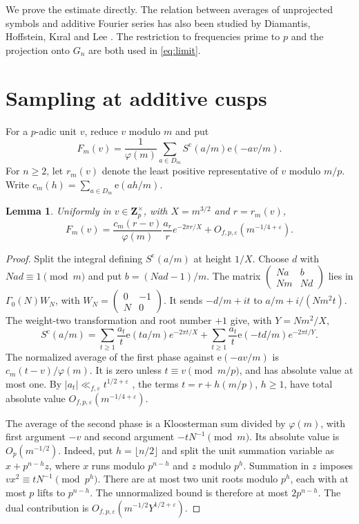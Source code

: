 \documentclass[11pt]{article}
\newtheorem{lemma}[theorem]{Lemma}
\newcommand{\Z}{\mathbf Z}
\newcommand{\ee}{\mathrm e}
\begin{document}
We prove the estimate directly. The relation between averages of
unprojected symbols and additive Fourier series has also been studied
by Diamantis, Hoffstein, K{\i}ral and Lee \cite{dhkl}.
The restriction to frequencies prime to \(p\) and the projection onto
\(G_n\) are both used in \eqref{eq:limit}.

\section{Sampling at additive cusps}

For a \(p\)-adic unit \(v\), reduce \(v\) modulo \(m\) and put
\[
 F_m(v)=\frac{1}{\varphi(m)}\sum_{a\in D_m}
                     S^{\mathrm c}(a/m)\ee(-av/m).
\]
For \(n\ge2\), let \(r_m(v)\) denote the least positive representative
of \(v\) modulo \(m/p\). Write \(c_m(h)=\sum_{a\in D_m}\ee(ah/m)\).

\begin{lemma}\label{lem:sampling}
Uniformly in \(v\in\Z_p^\times\), with \(X=m^{3/2}\) and \(r=r_m(v)\),
\[
 F_m(v)=\frac{c_m(r-v)}{\varphi(m)}\frac{a_r}{r}e^{-2\pi r/X}
           +O_{f,p,\varepsilon}(m^{-1/4+\varepsilon}).
\]
\end{lemma}

\begin{proof}
Split the integral defining \(S^{\mathrm c}(a/m)\) at height \(1/X\).
Choose \(d\) with \(Nad\equiv1\pmod m\) and put \(b=(Nad-1)/m\).
The matrix
\(\left(\begin{smallmatrix}Na&b\\ Nm&Nd\end{smallmatrix}\right)\)
lies in \(\Gamma_0(N)W_N\), with
\(W_N=\left(\begin{smallmatrix}0&-1\\N&0\end{smallmatrix}\right)\).
It sends \(-d/m+i t\) to \(a/m+i/(Nm^2t)\).
The weight-two transformation and root number \(+1\) give, with \(Y=Nm^2/X\),
\[
 S^{\mathrm c}(a/m)=
   \sum_{t\ge1}\frac{a_t}{t}\ee(ta/m)e^{-2\pi t/X}
   +\sum_{t\ge1}\frac{a_t}{t}\ee(-td/m)e^{-2\pi t/Y}.
\]
The normalized average of the first phase against \(\ee(-av/m)\) is
\(c_m(t-v)/\varphi(m)\). It is zero unless \(t\equiv v\pmod{m/p}\),
and has absolute value at most one. By
\(|a_t|\ll_{f,\varepsilon} t^{1/2+\varepsilon}\) \cite{deligne},
the terms \(t=r+h(m/p)\), \(h\ge1\), have total absolute value
\(O_{f,p,\varepsilon}(m^{-1/4+\varepsilon})\).

The average of the second phase is a Kloosterman sum divided by
\(\varphi(m)\), with first argument \(-v\) and second argument
\(-tN^{-1}\pmod m\). Its absolute value is \(O_p(m^{-1/2})\).
Indeed, put \(h=\lfloor n/2\rfloor\) and split the unit summation
variable as \(x+p^{n-h}z\), where \(x\) runs modulo \(p^{n-h}\)
and \(z\) modulo \(p^h\). Summation in \(z\) imposes
\(v x^2\equiv tN^{-1}\pmod{p^h}\). There are at most two unit roots
modulo \(p^h\), each with at most \(p\) lifts to \(p^{n-h}\).
The unnormalized bound is therefore at most \(2p^{n-h}\).
The dual contribution is \(O_{f,p,\varepsilon}(m^{-1/2}Y^{1/2+\varepsilon})\).
\end{proof}
\end{document}
